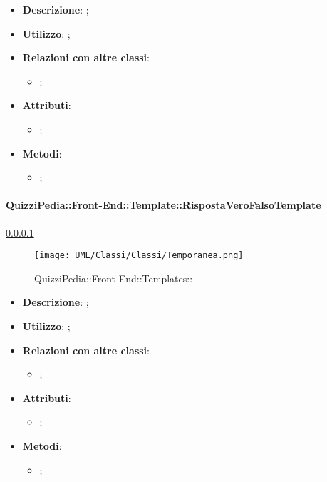 			\begin{itemize}
				\item \textbf{Descrizione}: ;
				\item \textbf{Utilizzo}: ;
				\item \textbf{Relazioni con altre classi}: 
				\begin{itemize}
					\item ;
				\end{itemize}
				\item \textbf{Attributi}: 
				\begin{itemize}
					\item ;
				\end{itemize}
				\item \textbf{Metodi}: 
				\begin{itemize}
					\item ;
				\end{itemize}
			\end{itemize}
		
		\paragraph{QuizziPedia::Front-End::Template::RispostaVeroFalsoTemplate}
		
				\label{QuizziPedia::Front-End::Templates::}
				\ref{QuizziPedia::Front-End::Templates::}
				\begin{figure}[h]
					\centering
					\texttt{[image: UML/Classi/Classi/Temporanea.png]}
					\caption{QuizziPedia::Front-End::Templates::}
				\end{figure}
		
			\begin{itemize}
				\item \textbf{Descrizione}: ;
				\item \textbf{Utilizzo}: ;
				\item \textbf{Relazioni con altre classi}: 
				\begin{itemize}
					\item ;
				\end{itemize}
				\item \textbf{Attributi}: 
				\begin{itemize}
					\item ;
				\end{itemize}
				\item \textbf{Metodi}: 
				\begin{itemize}
					\item ;
				\end{itemize}
			\end{itemize}
		
